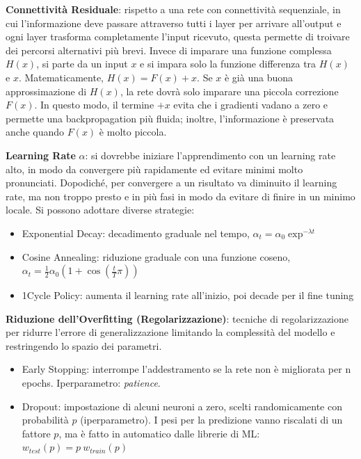 \documentclass{article}
\begin{document}
\textbf{Connettività Residuale}: rispetto a una rete con connettività sequenziale, in cui l'informazione deve passare attraverso tutti i layer per arrivare all'output e ogni layer trasforma completamente l'input ricevuto,
questa permette di troivare dei percorsi alternativi più brevi. Invece di imparare una funzione complessa $H(x)$, si parte da un input $x$ e si impara
solo la funzione differenza tra $H(x)$ e $x$. Matematicamente, $H(x)=F(x)+x$.
Se $x$ è già una buona approssimazione di $H(x)$, la rete dovrà solo imparare una piccola correzione $F(x)$.
\newline
In questo modo, il termine $+x$ evita che i gradienti vadano a zero e permette una backpropagation più fluida; inoltre, l'informazione è preservata anche quando $F(x)$ è molto piccola.

\textbf{Learning Rate} $\alpha$: si dovrebbe iniziare l'apprendimento con un learning rate alto, in modo da convergere più rapidamente ed evitare minimi molto pronunciati. Dopodiché, per convergere a un risultato
va diminuito il learning rate, ma non troppo presto e in più fasi in modo da evitare di finire in un minimo locale. Si possono adottare diverse strategie:
\begin{itemize}
    \item[-] Exponential Decay: decadimento graduale nel tempo, $\alpha_t=\alpha_0\exp^{-\lambda t}$
    \item[-] Cosine Annealing: riduzione graduale con una funzione coseno, $\alpha_t=\frac{1}{2}\alpha_0\left(1+\cos\left(\frac{t}{T}\pi\right)\right)$
    \item[-] 1Cycle Policy: aumenta il learning rate all'inizio, poi decade per il fine tuning  
\end{itemize}

\textbf{Riduzione dell'Overfitting (Regolarizzazione)}: tecniche di regolarizzazione per ridurre l'errore di generalizzazione limitando la complessità del modello e restringendo lo spazio dei parametri.
\begin{itemize}
    \item Early Stopping: interrompe l'addestramento se la rete non è migliorata per n epochs. Iperparametro: \textit{patience}.
    \item Dropout: impostazione di alcuni neuroni a zero, scelti randomicamente con probabilità $p$ (iperparametro). I pesi per la predizione vanno riscalati di un fattore $p$, ma è fatto in automatico dalle librerie di ML: $w_{test}(p)=p\ w_{train}(p)$
\end{itemize}
\end{document}
